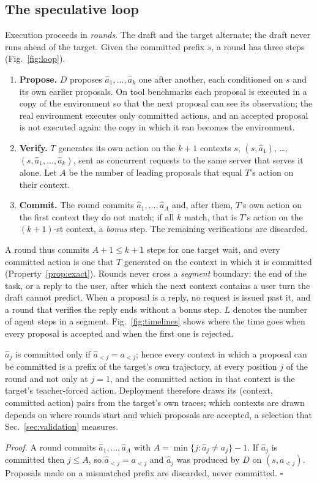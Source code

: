 \subsection{The speculative loop}
\label{app:detail:loop}
Execution proceeds in \emph{rounds}. The draft and the target alternate; the draft never runs ahead of the
target. Given the committed prefix $s$, a round has three steps (Fig.~\ref{fig:loop}).
\begin{enumerate}
  \item \textbf{Propose.} $D$ proposes $\hat a_1,\dots,\hat a_k$ one after another, each conditioned on
  $s$ and its own earlier proposals. On tool benchmarks each proposal is executed in a copy of the
  environment so that the next proposal can see its observation; the real environment executes only
  committed actions, and an accepted proposal is not executed again: the copy in which it ran becomes the
  environment.
  \item \textbf{Verify.} $T$ generates its own action on the $k{+}1$ contexts $s$, $(s,\hat a_1)$,
  \dots, $(s,\hat a_1,\dots,\hat a_k)$, sent as concurrent requests to the same server that serves it
  alone. Let $A$ be the number of leading proposals that equal $T$'s action on their context.
  \item \textbf{Commit.} The round commits $\hat a_1,\dots,\hat a_A$ and, after them, $T$'s own action on
  the first context they do not match; if all $k$ match, that is $T$'s action on the $(k{+}1)$-st
  context, a \emph{bonus} step. The remaining verifications are discarded.
\end{enumerate}
A round thus commits $A{+}1 \le k{+}1$ steps for one target wait, and every committed action is one that
$T$ generated on the context in which it is committed (Property~\ref{prop:exact}). Rounds never cross a
\emph{segment} boundary: the end of the task, or a reply to the user, after which the next context
contains a user turn the draft cannot predict. When a proposal is a reply, no request is issued past it,
and a round that verifies the reply ends without a bonus step. $L$ denotes the number of agent steps in a
segment. Fig.~\ref{fig:timelines} shows where the time goes when every proposal is accepted and when
the first one is rejected.

\begin{proposition}
\label{prop:commit}
$\hat a_j$ is committed only if $\hat a_{<j} = a_{<j}$; hence every context in which a proposal can be
committed is a prefix of the target's own trajectory, at every position $j$ of the round and not only at
$j{=}1$, and the committed action in that context is the target's teacher-forced action. Deployment
therefore draws its (context, committed action) pairs from the target's own traces; which contexts are
drawn depends on where rounds start and which proposals are accepted, a selection that
Sec.~\ref{sec:validation} measures.
\end{proposition}
\emph{Proof.} A round commits $\hat a_1,\dots,\hat a_A$ with $A = \min\{j : \hat a_j \neq a_j\} - 1$. If
$\hat a_j$ is committed then $j \le A$, so $\hat a_{<j} = a_{<j}$ and $\hat a_j$ was produced by
$D$ on $(s, a_{<j})$. Proposals made on a mismatched prefix are discarded, never committed.
\hfill$\square$

